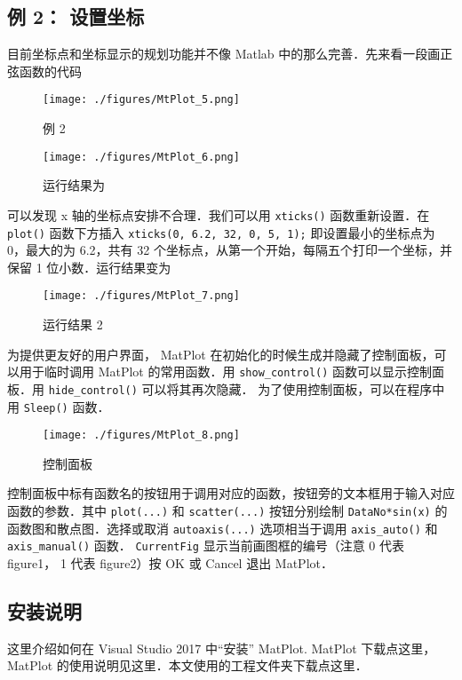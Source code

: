 \subsection{例 2： 设置坐标}

目前坐标点和坐标显示的规划功能并不像 Matlab 中的那么完善．先来看一段画正弦函数的代码

\begin{figure}[ht]
\centering
\texttt{[image: ./figures/MtPlot\_5.png]}
\caption{例 2} \label{MtPlot_fig5}
\end{figure}

\begin{figure}[ht]
\centering
\texttt{[image: ./figures/MtPlot\_6.png]}
\caption{运行结果为} \label{MtPlot_fig6}
\end{figure}

可以发现 x 轴的坐标点安排不合理．我们可以用 \verb|xticks()| 函数重新设置．在 \verb|plot()| 函数下方插入
\verb|xticks(0, 6.2, 32, 0, 5, 1);|
即设置最小的坐标点为 0，最大的为 6.2，共有 32 个坐标点，从第一个开始，每隔五个打印一个坐标，并保留 1 位小数．运行结果变为

\begin{figure}[ht]
\centering
\texttt{[image: ./figures/MtPlot\_7.png]}
\caption{运行结果 2} \label{MtPlot_fig7}
\end{figure}

为提供更友好的用户界面， MatPlot 在初始化的时候生成并隐藏了控制面板，可以用于临时调用 MatPlot 的常用函数．用 \verb|show_control()| 函数可以显示控制面板．用 \verb|hide_control()| 可以将其再次隐藏． 为了使用控制面板，可以在程序中用 \verb|Sleep()| 函数．

\begin{figure}[ht]
\centering
\texttt{[image: ./figures/MtPlot\_8.png]}
\caption{控制面板} \label{MtPlot_fig8}
\end{figure}

控制面板中标有函数名的按钮用于调用对应的函数，按钮旁的文本框用于输入对应函数的参数．其中 \verb|plot(...)| 和 \verb|scatter(...)| 按钮分别绘制 \verb|DataNo*sin(x)| 的函数图和散点图．选择或取消 \verb|autoaxis(...)| 选项相当于调用 \verb|axis_auto()| 和 \verb|axis_manual()| 函数． \verb|CurrentFig| 显示当前画图框的编号（注意 0 代表 figure1， 1 代表 figure2）按 OK 或 Cancel 退出 MatPlot．


\subsection{安装说明}
这里介绍如何在 Visual Studio 2017 中“安装” MatPlot. MatPlot 下载点这里， MatPlot 的使用说明见这里．本文使用的工程文件夹下载点这里．

